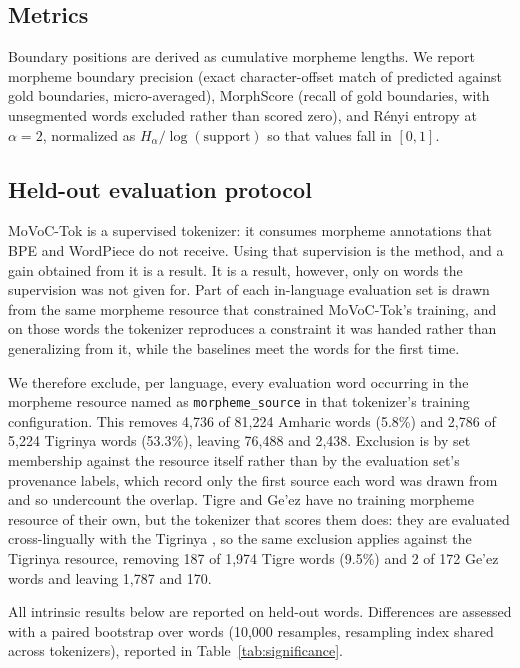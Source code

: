 \documentclass[11pt]{article}
\begin{document}
\subsection{Metrics}

Boundary positions are derived as cumulative morpheme lengths. We report
morpheme boundary precision (exact character-offset match of predicted against
gold boundaries, micro-averaged), MorphScore (recall of gold boundaries, with
unsegmented words excluded rather than scored zero), and R\'enyi entropy at
$\alpha = 2$, normalized as $H_\alpha / \log(\text{support})$ so that values
fall in $[0, 1]$.

\subsection{Held-out evaluation protocol}
\label{sec:heldout}

MoVoC-Tok is a supervised tokenizer: it consumes morpheme annotations that BPE
and WordPiece do not receive. Using that supervision is the method, and a gain
obtained from it is a result. It is a result, however, only on words the
supervision was not given for. Part of each in-language evaluation set is drawn
from the same morpheme resource that constrained MoVoC-Tok's training, and on
those words the tokenizer reproduces a constraint it was handed rather than
generalizing from it, while the baselines meet the words for the first time.

We therefore exclude, per language, every evaluation word occurring in the
morpheme resource named as \texttt{morpheme\_source} in that tokenizer's
training configuration. This removes 4,736 of 81,224 Amharic words (5.8\%) and
2,786 of 5,224 Tigrinya words (53.3\%), leaving 76,488 and 2,438. Exclusion is
by set membership against the resource itself rather than by the evaluation
set's provenance labels, which record only the first source each word was drawn
from and so undercount the overlap. Tigre and Ge'ez have no training morpheme
resource of their own, but the tokenizer that scores them does: they are
evaluated cross-lingually with the Tigrinya \movoctok{}, so the same exclusion
applies against the Tigrinya resource, removing 187 of 1,974 Tigre words
(9.5\%) and 2 of 172 Ge'ez words and leaving 1,787 and 170.

All intrinsic results below are reported on held-out words. Differences are
assessed with a paired bootstrap over words (10,000 resamples, resampling index
shared across tokenizers), reported in Table~\ref{tab:significance}.
\end{document}
